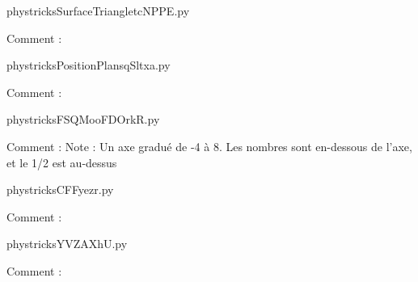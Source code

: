 
    \newcommand{\CaptionFigSurfaceTriangletcNPPE}{<+Type your caption here+>}
    \begin{center}
        
    \end{center}
    phystricksSurfaceTriangletcNPPE.py

    Comment : 

    \clearpage
    


    \newcommand{\CaptionFigPositionPlansqSltxa}{<+Type your caption here+>}
    \begin{center}
        
    \end{center}
    phystricksPositionPlansqSltxa.py

    Comment : 

    \clearpage
    


    \newcommand{\CaptionFigFSQMooFDOrkR}{<+Type your caption here+>}
    \begin{center}
        
    \end{center}
    phystricksFSQMooFDOrkR.py

    Comment : Note : Un axe gradué de -4 à 8. Les nombres sont en-dessous de l'axe, et le 1/2 est au-dessus

    \clearpage
    


    \newcommand{\CaptionFigCFFyezr}{<+Type your caption here+>}
    \begin{center}
        
    \end{center}
    phystricksCFFyezr.py

    Comment : 

    \clearpage
    


    \newcommand{\CaptionFigYVZAXhU}{<+Type your caption here+>}
    \begin{center}
        
    \end{center}
    phystricksYVZAXhU.py

    Comment : 

    \clearpage
    

